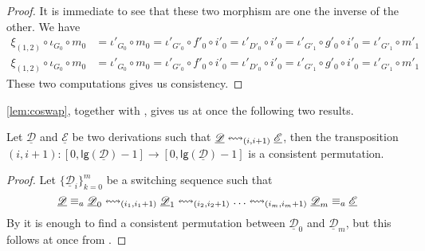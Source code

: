 \documentclass[a4paper,UKenglish,cleveref,pdftex,thm-restate,numberwithinsect,anonymous]{lipics}
\newcommand{\dder}[1]{\mathscr{#1}}
\newcommand{\der}[1]{\underline{\dder{#1}}}
\newcommand{\lgh}[0]{\mathsf{lg}}
\newcommand{\shift}[1]{\ensuremath{\mathrel{{\leftrightsquigarrow}_{#1}}}}
\begin{document}
\begin{proof}
	It is immediate to see that these two morphism are one the inverse of the other. We have
\begin{align*}		\xi_{(1,2)}\circ \iota_{G_0}\circ m_0&= \iota'_{G_0}\circ m_0=\iota'_{G'_0}\circ f'_0
	\circ i'_0=\iota'_{D'_0}\circ i'_0=	\iota'_{G'_1}\circ g'_0\circ i'_0=\iota'_{G'_1}\circ m'_1\\
			\xi_{(1,2)}\circ \iota_{G_0}\circ m_0&= \iota'_{G_0}\circ m_0=\iota'_{G'_0}\circ f'_0
	\circ i'_0=\iota'_{D'_0}\circ i'_0=	\iota'_{G'_1}\circ g'_0\circ i'_0=\iota'_{G'_1}\circ m'_1
\end{align*}
	These two computations gives us consistency.
\end{proof}



\cref{lem:coswap}, together with , gives us at once the following two results.

\begin{corollary}\label{cor:coswap}
Let $\der{D}$ and $\der{E}$ be two derivations such that $\der{D} \shift{\transp{i}} \der{E}$, then the transposition $(i,i+1):[0,\lgh(\der{D})-1] \to [0,\lgh(\der{D})-1] $ is a consistent permutation.
\end{corollary}


\propcoswitch*
\label{propcoswitch-proof}
\begin{proof}
	Let $\{\der{D}_{i}\}_{k=0}^m$ be a switching sequence such that 
	    \[\der{D}\equiv_a \der{D}_0 \shift{\transp{i_1}} \der{D}_1 \shift{\transp{i_2}} \ldots \shift{\transp{i_m}}
	\der{D}_m\equiv _a \der{E}\]
By  it is enough to find a consistent permutation between $\der{D}_0$ and $\der{D}_m$, but this follows at once from .
\end{proof}
\end{document}
